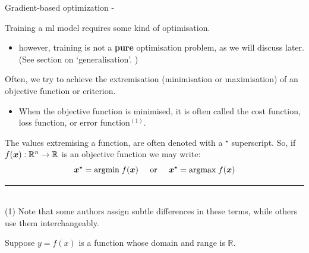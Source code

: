 
\begin{frame}[t,allowframebreaks]{Gradient-based optimization -}


    Training a \gls{ml} model requires 
    some kind of \gls{optimisation}.
    \begin{itemize}
        \item however, training is not a {\bf pure} \gls{optimisation} problem, 
        as we will discuss later. (See section on `\Gls{generalisation}'. 
        \hyperlink{sec:Generalisation}{})
    \end{itemize}
    \vspace{0.2cm}

    Often, we try to achieve the \gls{extremisation} 
    (minimisation or maximisation) of an 
    \gls{objective function} or 
    \gls{criterion}.
    \begin{itemize}
        \item 
            When the \gls{objective function} is minimised, 
            it is often called the
            \gls{cost function},
            \gls{loss function}, or
            \gls{error function}$^(1)$.
    \end{itemize}
    \vspace{0.2cm}
    The values extremising a function, 
    are often denoted with a $^\star$ superscript.
    So, if $f(\boldsymbol{x}): \mathbb{R}^n \rightarrow \mathbb{R}$ 
    is an \gls{objective function}
    we may write:
    \begin{equation*}
        \boldsymbol{x}^{\star} = \mathrm{argmin} \; f(\boldsymbol{x})
        \;\;\;\;\; \textrm{or} \;\;\;\;\;
        \boldsymbol{x}^{\star} = \mathrm{argmax} \; f(\boldsymbol{x})
    \end{equation*}

    \vspace{0.1cm}
    \noindent\rule{4cm}{0.4pt}\\
    {\tiny
    (1) Note that some authors assign subtle differences in these terms,
    while others use them interchangeably.\\
    }
    
    \framebreak


    Suppose $y=f(x)$ is a function whose domain and range is $\mathbb{R}$.\\
    \vspace{0.2cm}


\end{frame}
